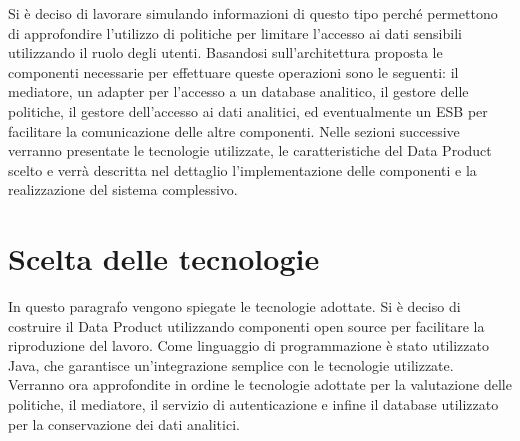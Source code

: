 \documentclass[12pt]{report}
\begin{document}
Si è deciso di lavorare simulando informazioni di questo tipo perché permettono di approfondire l'utilizzo di politiche per limitare l'accesso ai dati sensibili utilizzando il ruolo degli utenti.
Basandosi sull'architettura proposta le componenti necessarie per effettuare queste operazioni sono le seguenti: il mediatore, un adapter per l'accesso a un database analitico, il gestore delle politiche, il gestore dell'accesso ai dati analitici, ed eventualmente un ESB per facilitare la comunicazione delle altre componenti.
Nelle sezioni successive verranno presentate le tecnologie utilizzate, le caratteristiche del Data Product scelto e  verrà descritta nel dettaglio l'implementazione delle componenti e la realizzazione del sistema complessivo.

\section{Scelta delle tecnologie}
In questo paragrafo vengono spiegate le tecnologie adottate.
Si è deciso di costruire il Data Product utilizzando componenti open source per facilitare la riproduzione del lavoro.
Come linguaggio di programmazione è stato utilizzato Java, che garantisce un'integrazione semplice con le tecnologie utilizzate.
Verranno ora approfondite in ordine le tecnologie adottate per la valutazione delle politiche, il mediatore, il servizio di autenticazione e infine il database utilizzato per la conservazione dei dati analitici.
\end{document}
